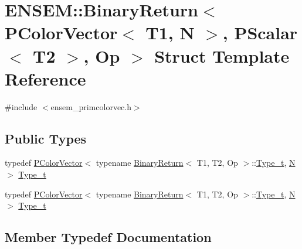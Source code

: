 \hypertarget{structENSEM_1_1BinaryReturn_3_01PColorVector_3_01T1_00_01N_01_4_00_01PScalar_3_01T2_01_4_00_01Op_01_4}{}\section{E\+N\+S\+EM\+:\+:Binary\+Return$<$ P\+Color\+Vector$<$ T1, N $>$, P\+Scalar$<$ T2 $>$, Op $>$ Struct Template Reference}
\label{structENSEM_1_1BinaryReturn_3_01PColorVector_3_01T1_00_01N_01_4_00_01PScalar_3_01T2_01_4_00_01Op_01_4}


{\ttfamily \#include $<$ensem\+\_\+primcolorvec.\+h$>$}

\subsection*{Public Types}
\begin{DoxyCompactItemize}
\item 
typedef \mbox{\hyperlink{classENSEM_1_1PColorVector}{P\+Color\+Vector}}$<$ typename \mbox{\hyperlink{structENSEM_1_1BinaryReturn}{Binary\+Return}}$<$ T1, T2, Op $>$\+::\mbox{\hyperlink{structENSEM_1_1BinaryReturn_3_01PColorVector_3_01T1_00_01N_01_4_00_01PScalar_3_01T2_01_4_00_01Op_01_4_aa1c63622b6c827a70045ca780056506c}{Type\+\_\+t}}, \mbox{\hyperlink{operator__name__util_8cc_a7722c8ecbb62d99aee7ce68b1752f337}{N}} $>$ \mbox{\hyperlink{structENSEM_1_1BinaryReturn_3_01PColorVector_3_01T1_00_01N_01_4_00_01PScalar_3_01T2_01_4_00_01Op_01_4_aa1c63622b6c827a70045ca780056506c}{Type\+\_\+t}}
\item 
typedef \mbox{\hyperlink{classENSEM_1_1PColorVector}{P\+Color\+Vector}}$<$ typename \mbox{\hyperlink{structENSEM_1_1BinaryReturn}{Binary\+Return}}$<$ T1, T2, Op $>$\+::\mbox{\hyperlink{structENSEM_1_1BinaryReturn_3_01PColorVector_3_01T1_00_01N_01_4_00_01PScalar_3_01T2_01_4_00_01Op_01_4_aa1c63622b6c827a70045ca780056506c}{Type\+\_\+t}}, \mbox{\hyperlink{operator__name__util_8cc_a7722c8ecbb62d99aee7ce68b1752f337}{N}} $>$ \mbox{\hyperlink{structENSEM_1_1BinaryReturn_3_01PColorVector_3_01T1_00_01N_01_4_00_01PScalar_3_01T2_01_4_00_01Op_01_4_aa1c63622b6c827a70045ca780056506c}{Type\+\_\+t}}
\end{DoxyCompactItemize}


\subsection{Member Typedef Documentation}
\mbox{\label{structENSEM_1_1BinaryReturn_3_01PColorVector_3_01T1_00_01N_01_4_00_01PScalar_3_01T2_01_4_00_01Op_01_4_aa1c63622b6c827a70045ca780056506c}} 
